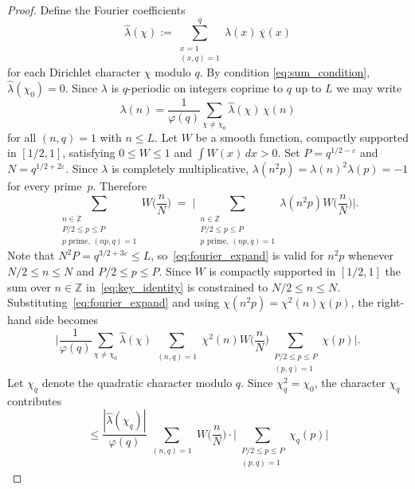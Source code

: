 \documentclass[11pt]{amsart}
\begin{document}
\begin{proof}
Define the Fourier coefficients
\[
\widehat{\lambda}(\chi) := \sum_{\substack{x = 1 \\ (x,q)=1}}^{q}
\lambda(x)\, \overline{\chi}(x)
\]
for each Dirichlet character $\chi$ modulo $q$.
By condition \eqref{eq:sum_condition}, $\widehat{\lambda}(\chi_0) = 0$.
Since $\lambda$ is $q$-periodic on integers coprime to $q$ up to $L$
we may write
\begin{equation}\label{eq:fourier_expand}
\lambda(n) = \frac{1}{\varphi(q)} \sum_{\chi \neq \chi_0}
\widehat{\lambda}(\chi)\, \chi(n)
\end{equation}
for all $(n,q) = 1$ with $n \leq L$. Let $W$ be a smooth function, compactly supported in $[1/2,1]$, satisfying $0 \leq W \leq 1$ and 
$\int W(x)\, dx > 0$. 
Set $P = q^{1/2 - \varepsilon}$ and $N = q^{1/2 + 2\varepsilon}$.
Since $\lambda$ is completely multiplicative,
$\lambda(n^2 p) = \lambda(n)^2 \lambda(p) = -1$ for every prime~$p$.
Therefore
\begin{equation}\label{eq:key_identity}
 \sum_{\substack{n \in \mathbb{Z} \\ P/2 \leq p \leq P \\ p \text{ prime},\, (np,q)=1}} W \Big (\frac{n}{N} \Big )
\;=\;
\biggl|
\sum_{\substack{n \in \mathbb{Z} \\ P/2 \leq p \leq P \\ p \text{ prime},\, (np,q)=1}}
\lambda(n^2 p) W \Big ( \frac{n}{N} \Big )
\biggr|.
\end{equation}
Note that $N^2 P = q^{3/2 + 3\varepsilon} \leq L$,
so~\eqref{eq:fourier_expand} is valid for $n^2 p$ whenever
$N/2 \leq n \leq N$ and $P/2 \leq p \leq P$. Since $W$ is compactly supported in $[1/2,1]$ the sum over $n \in \mathbb{Z}$ in~\eqref{eq:key_identity} is constrained to $N/2 \leq n \leq N$.
Substituting~\eqref{eq:fourier_expand} and using
$\chi(n^2 p) = \chi^2(n)\chi(p)$, the right-hand side becomes
\begin{equation}\label{eq:char_expand}
\biggl|
\frac{1}{\varphi(q)} \sum_{\chi \neq \chi_0} \widehat{\lambda}(\chi)
\sum_{\substack{(n,q)=1}} \chi^2(n) W \Big ( \frac{n}{N} \Big )
\sum_{\substack{P/2 \leq p \leq P \\ (p,q)=1}} \chi(p)
\biggr|.
\end{equation}
Let $\chi_q$ denote the quadratic character modulo $q$.
Since $\chi_q^2 = \chi_0$, the character $\chi_q$ contributes
\[
\leq \frac{|\widehat{\lambda}(\chi_q)|}{\varphi(q)}
\sum_{\substack{(n,q)=1}} W \Big ( \frac{n}{N} \Big )
\cdot
\biggl| \sum_{\substack{P/2 \leq p \leq P \\ (p,q)=1}} \chi_q(p) \biggr|
\]
\end{proof}
\end{document}
